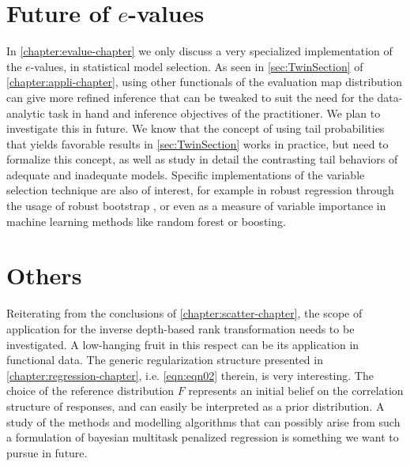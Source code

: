 \section{Future of $e$-values}
In \ref{chapter:evalue-chapter} we only discuss a very specialized implementation of the $e$-values, in statistical model selection. As seen in \ref{sec:TwinSection} of \ref{chapter:appli-chapter}, using other functionals of the evaluation map distribution can give more refined inference that can be tweaked to suit the need for the data-analytic task in hand and inference objectives of the practitioner. We plan to investigate this in future. We know that the concept of using tail probabilities that yields favorable results in \ref{sec:TwinSection} works in practice, but need to formalize this concept, as well as study in detail the contrasting tail behaviors of adequate and inadequate models. Specific implementations of the variable selection technique are also of interest, for example in robust regression through the usage of robust bootstrap \citep{SBVanAelst08, SBZamar02}, or even as a measure of variable importance in machine learning methods like random forest or boosting.

\section{Others}
Reiterating from the conclusions of \ref{chapter:scatter-chapter}, the scope of application for the inverse depth-based rank transformation needs to be investigated. A low-hanging fruit in this respect can be its application in functional data. The generic regularization structure presented in \ref{chapter:regression-chapter}, i.e. \ref{eqn:eqn02} therein, is very interesting. The choice of the reference distribution $F$ represents an initial belief on the correlation structure of responses, and can easily be interpreted as a prior distribution. A study of the methods and modelling algorithms that can possibly arise from such a formulation of bayesian multitask penalized regression is something we want to pursue in future.